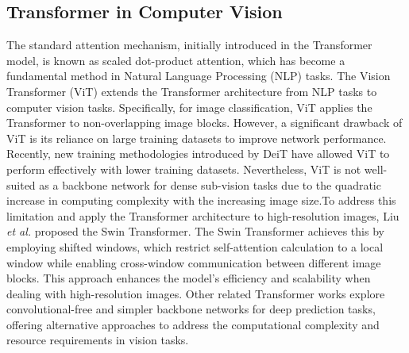 \documentclass[review,12pt, 3p]{elsarticle}
\begin{document}
\subsection{Transformer in Computer Vision}
The standard attention mechanism, initially introduced in the Transformer model, is known as scaled dot-product attention, which has become a fundamental method in Natural Language Processing (NLP) tasks. The Vision Transformer (ViT) \cite{ref-36} extends the Transformer architecture from NLP tasks to computer vision tasks. Specifically, for image classification, ViT applies the Transformer to non-overlapping image blocks. However, a significant drawback of ViT is its reliance on large training datasets to improve network performance. Recently, new training methodologies introduced by DeiT have allowed ViT to perform effectively with lower training datasets. Nevertheless, ViT is not well-suited as a backbone network for dense sub-vision tasks due to the quadratic increase in computing complexity with the increasing image size.To address this limitation and apply the Transformer architecture to high-resolution images, Liu \textit{et al.} \cite{ref-35} proposed the Swin Transformer. The Swin Transformer achieves this by employing shifted windows, which restrict self-attention calculation to a local window while enabling cross-window communication between different image blocks. This approach enhances the model's efficiency and scalability when dealing with high-resolution images. Other related Transformer works \cite{ref-37, ref-46} explore convolutional-free and simpler backbone networks for deep prediction tasks, offering alternative approaches to address the computational complexity and resource requirements in vision tasks.\\
\end{document}
